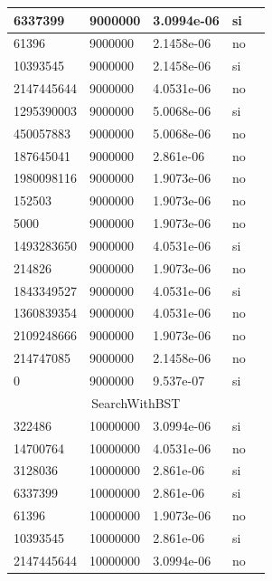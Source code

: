 \documentclass[12pt, fleqn]{article}                             %
\theoremstyle{break}                                            %
\begin{document}
\begin{longtable}{|m{5em}|m{5em}|m{10em}|m{5em}|@{}m{0pt}@{}}
            6337399& 9000000  & 3.0994e-06 & si &\\[1em]    \hline
            61396& 9000000  & 2.1458e-06 & no &\\[1em]    \hline
            10393545& 9000000  & 2.1458e-06 & si &\\[1em]    \hline
            2147445644& 9000000  & 4.0531e-06 & no &\\[1em]    \hline
            1295390003& 9000000  & 5.0068e-06 & si &\\[1em]    \hline
            450057883& 9000000  & 5.0068e-06 & no &\\[1em]    \hline
            187645041& 9000000  & 2.861e-06 & no &\\[1em]    \hline
            1980098116& 9000000  & 1.9073e-06 & no &\\[1em]    \hline
            152503& 9000000  & 1.9073e-06 & no &\\[1em]    \hline
            5000& 9000000  & 1.9073e-06 & no &\\[1em]    \hline
            1493283650& 9000000  & 4.0531e-06 & si &\\[1em]    \hline
            214826& 9000000  & 1.9073e-06 & no &\\[1em]    \hline
            1843349527& 9000000  & 4.0531e-06 & si &\\[1em]    \hline
            1360839354& 9000000  & 4.0531e-06 & no &\\[1em]    \hline
            2109248666& 9000000  & 1.9073e-06 & no &\\[1em]    \hline
            214747085& 9000000  & 2.1458e-06 & no &\\[1em]    \hline
            0& 9000000  & 9.537e-07 & si &\\[1em]    \hline
            \multicolumn{5}{|c|}{SearchWithBST}   \\          \hline
            322486& 10000000  & 3.0994e-06 & si &\\[1em]    \hline
            14700764& 10000000  & 4.0531e-06 & no &\\[1em]    \hline
            3128036& 10000000  & 2.861e-06 & si &\\[1em]    \hline
            6337399& 10000000  & 2.861e-06 & si &\\[1em]    \hline
            61396& 10000000  & 1.9073e-06 & no &\\[1em]    \hline
            10393545& 10000000  & 2.861e-06 & si &\\[1em]    \hline
            2147445644& 10000000  & 3.0994e-06 & no &\\[1em]    \hline

\end{longtable}
\end{document}
